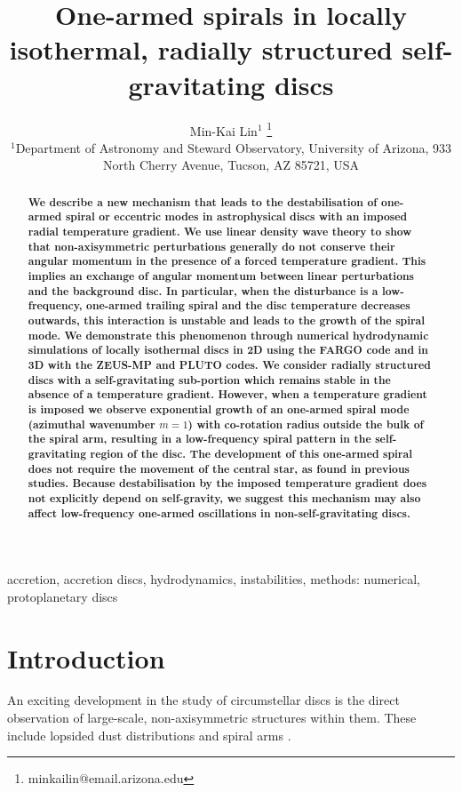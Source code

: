 \documentclass[useAMS,usenatbib]{mn2e}
\title[One-armed spirals]{One-armed spirals in 
  locally isothermal, radially structured self-gravitating discs}
\author[Lin]{Min-Kai Lin$^{1}$
  \thanks{ minkailin@email.arizona.edu} \\ 
  $^1$Department of Astronomy and Steward Observatory, University of
  Arizona, 933 North Cherry Avenue, Tucson, AZ 85721, USA 
}
\begin{document}
\maketitle
\begin{abstract} 
  {\bf We describe a new mechanism that leads to the destabilisation of
  one-armed spiral or eccentric modes in astrophysical discs with 
  an imposed radial temperature gradient.  We use linear density wave
  theory 
  to show that non-axisymmetric perturbations generally do not conserve
  their angular momentum in the presence of a forced temperature
  gradient. This implies an exchange of angular momentum
  between linear perturbations and the background disc. In particular, 
  when the disturbance is a low-frequency, one-armed
  trailing spiral and the disc temperature decreases outwards, this 
  interaction is unstable and leads to the growth of the spiral mode.  
  We demonstrate this phenomenon through numerical hydrodynamic
  simulations of locally isothermal discs in 2D using the FARGO
  code and in 3D with  the ZEUS-MP and PLUTO codes.  We consider
  radially structured discs with a self-gravitating sub-portion which remains
  stable in the absence of a temperature gradient. However,
  when a temperature gradient is imposed we observe exponential growth of an one-armed  
  spiral mode (azimuthal wavenumber $m=1$) with co-rotation radius 
  outside the bulk of the spiral arm, resulting in a low-frequency  
  spiral pattern in the self-gravitating region of the disc.  The development of this one-armed 
 spiral does not require the movement of the central star, as found in previous studies. 
 Because destabilisation by the imposed temperature gradient does 
 not explicitly depend on self-gravity, we suggest this mechanism may also
 affect low-frequency one-armed oscillations in non-self-gravitating
 discs. 
}
\end{abstract}



\begin{keywords}
  accretion, accretion discs, hydrodynamics, instabilities, methods: numerical, protoplanetary discs 
\end{keywords}

\section{Introduction}\label{intro}
An exciting development in the study of circumstellar 
discs is the direct observation of large-scale, non-axisymmetric
structures within them. These
include lopsided dust distributions 
\citep{marel13,fukagawa13,casassus13,isella13,perez14,follette14} and
spiral arms 
\citep{hashimoto11,muto12,boccaletti14,grady13,christiaens14,avenhaus14}. 
\end{document}
